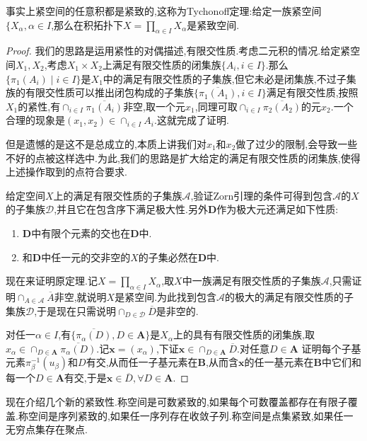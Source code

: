 事实上紧空间的任意积都是紧致的,这称为Tychonoff定理:给定一族紧空间$\{X_{\alpha},\alpha\in I$,那么在积拓扑下$X=\prod_{\alpha\in I}X_{\alpha}$是紧致空间.
\begin{proof}
	
我们的思路是运用紧性的对偶描述,有限交性质.考虑二元积的情况.给定紧空间$X_1,X_2$,考虑$X_1\times X_2$上满足有限交性质的闭集族$\{A_i,i\in I\}$.那么$\{\pi_1(A_i)\mid i\in I\}$是$X_1$中的满足有限交性质的子集族,但它未必是闭集族,不过子集族的有限交性质可以推出闭包构成的子集族$\{\overline{\pi_1(A_1)},i\in I\}$满足有限交性质,按照$X_1$的紧性,有$\cap_{i\in I}\overline{\pi_1(A_i)}$非空,取一个元$x_1$,同理可取$\cap_{i\in I}\overline{\pi_2(A_2)}$的元$x_2$.一个合理的现象是$(x_1,x_2)\in\cap_{i\in I}A_i$.这就完成了证明.

但是遗憾的是这不是总成立的,本质上讲我们对$x_1$和$x_2$做了过少的限制,会导致一些不好的点被这样选中.为此,我们的思路是扩大给定的满足有限交性质的闭集族,使得上述操作取到的点符合要求.

给定空间$X$上的满足有限交性质的子集族$\mathscr{A}$,验证Zorn引理的条件可得到包含$\mathscr{A}$的$X$的子集族$\mathscr{D}$,并且它在包含序下满足极大性.另外$\textbf{D}$作为极大元还满足如下性质:
\begin{enumerate}
	\item $\textbf{D}$中有限个元素的交也在$\textbf{D}$中.
	\item 和$\textbf{D}$中任一元的交非空的$X$的子集必然在$\textbf{D}$中.
\end{enumerate}

现在来证明原定理.记$X=\prod_{\alpha\in I}X_{\alpha}$,取$X$中一族满足有限交性质的子集族$\mathscr{A}$,只需证明$\cap_{A\in\mathscr{A}}\overline{A}$非空,就说明$X$是紧空间.为此找到包含$\mathscr{A}$的极大的满足有限交性质的子集族$\mathscr{D}$,于是现在只需说明$\cap_{D\in\mathscr{D}}\overline{D}$是非空的.

对任一$\alpha\in I$,有$\{\overline{\pi_{\alpha}(D)},D\in\textbf{A}\}$是$X_{\alpha}$上的具有有限交性质的闭集族,取$x_{\alpha}
\in\cap_{D\in\textbf{A}}\overline{\pi_{\alpha}(D)}$.记$\textbf{x}=(x_{\alpha})$,下证$\textbf{x}\in\cap_{D\in\textbf{A}}\overline{D}$.对任意$D\in\textbf{A}$
证明每个子基元素$\pi_{\beta}^{-1}\left(u_{\beta}\right)$和$D$有交,从而任一子基元素在$\textbf{B}$,从而含$\textbf{x}$的任一基元素在$\textbf{B}$中它们和每一个$D\in\textbf{A}$有交,于是$\textbf{x}\in\overline{D},\forall D\in\textbf{A}$.
\end{proof}

现在介绍几个新的紧致性.称空间是可数紧致的,如果每个可数覆盖都存在有限子覆盖.称空间是序列紧致的,如果任一序列存在收敛子列.称空间是点集紧致,如果任一无穷点集存在聚点.

